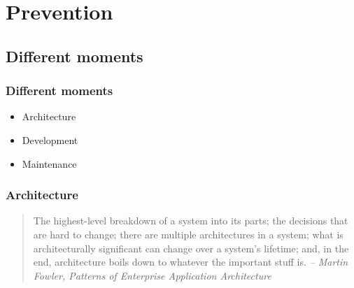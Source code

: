 \section{Prevention}

\subsection{Different moments}

\begin{frame}
\frametitle{Different moments}

\begin{itemize}
\item Architecture
\item Development
\item Maintenance
\end{itemize}
\end{frame}

\begin{frame}
\frametitle{Architecture}
\begin{quote}
\begin{small}
The {\Large highest-level breakdown} of a system into its parts; the decisions that are
{\Large hard to change}; there are multiple architectures in a system; what is
architecturally significant can change over a system's lifetime; and, in the
end, architecture boils down to whatever the {\Large important stuff} is.
\newline \textit{-- Martin Fowler, Patterns of Enterprise Application Architecture}
\end{small}
\end{quote}
\end{frame}

